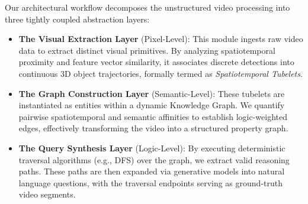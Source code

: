 Our architectural workflow decomposes the unstructured video processing into three tightly coupled abstraction layers:
\begin{itemize}
    \item \textbf{The Visual Extraction Layer} (Pixel-Level): This module ingests raw video data to extract distinct visual primitives. By analyzing spatiotemporal proximity and feature vector similarity, it associates discrete detections into continuous 3D object trajectories, formally termed as \textit{Spatiotemporal Tubelets}.
    \item \textbf{The Graph Construction Layer} (Semantic-Level): These tubelets are instantiated as entities within a dynamic Knowledge Graph. We quantify pairwise spatiotemporal and semantic affinities to establish logic-weighted edges, effectively transforming the video into a structured property graph.
    \item \textbf{The Query Synthesis Layer} (Logic-Level): By executing deterministic traversal algorithms (e.g., DFS) over the graph, we extract valid reasoning paths. These paths are then expanded via generative models into natural language questions, with the traversal endpoints serving as ground-truth video segments.
\end{itemize}



